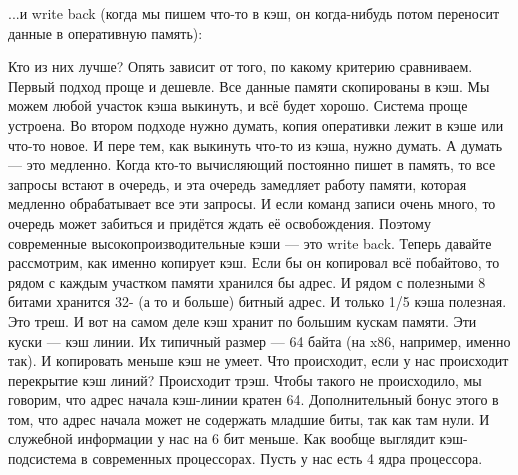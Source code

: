 \documentclass{article}
\begin{document}
    ...и write back (когда мы пишем что-то в кэш, он когда-нибудь потом переносит данные в оперативную память):
    \begin{center}
    \end{center}
    Кто из них лучше? Опять зависит от того, по какому критерию сравниваем. Первый подход проще и дешевле. Все данные памяти скопированы в кэш. Мы можем любой участок кэша выкинуть, и всё будет хорошо. Система проще устроена. Во втором подходе нужно думать, копия оперативки лежит в кэше или что-то новое. И пере тем, как выкинуть что-то из кэша, нужно думать. А думать --- это медленно. Когда кто-то вычисляющий постоянно пишет в память, то все запросы встают в очередь, и эта очередь замедляет работу памяти, которая медленно обрабатывает все эти запросы. И если команд записи очень много, то очередь может забиться и придётся ждать её освобождения. Поэтому современные высокопроизводительные кэши --- это write back. Теперь давайте рассмотрим, как именно копирует кэш. Если бы он копировал всё побайтово, то рядом с каждым участком памяти хранился бы адрес. И рядом с полезными 8 битами хранится 32- (а то и больше) битный адрес. И только 1/5 кэша полезная. Это треш. И вот на самом деле кэш хранит по большим кускам памяти. Эти куски --- кэш линии. Их типичный размер --- 64 байта (на x86, например, именно так). И копировать меньше кэш не умеет. Что происходит, если у нас происходит перекрытие кэш линий? Происходит трэш. Чтобы такого не происходило, мы говорим, что адрес начала кэш-линии кратен 64. Дополнительный бонус этого в том, что адрес начала может не содержать младшие биты, так как там нули. И служебной информации у нас на 6 бит меньше. Как вообще выглядит кэш-подсистема в современных процессорах. Пусть у нас есть 4 ядра процессора.
\end{document}
